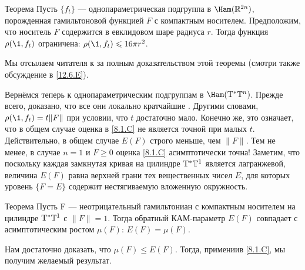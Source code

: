\begin{thm}{Теорема}\label{8.2.A}
Пусть $\{f_t\}$ — однопараметрическая подгруппа в $\Ham (\RR^{2n})$,
порожденная гамильтоновой функцией $F$ с компактным носителем. 
Предположим, что носитель $F$ содержится в евклидовом шаре радиуса
$r$. 
Тогда функция $\rho (\1, f_t)$ ограничена: $\rho (\1, f_t) \z\le 16\pi
r^2$. 
\end{thm}

Мы отсылаем читателя к \cite[с. 177]{HZ} за полным доказательством
этой теоремы (смотри также обсуждение в \ref{12.6.E}). 

Вернёмся теперь к однопараметрическим подгруппам в $\Ham (\T^\ast \TT^n)$.
Прежде всего, доказано, что все они локально кратчайшие \cite{LM2}.
Другими словами, $\rho (\1, f_t) = t \| F \|$ при условии, что $t$
достаточно мало. 
Конечно же, это означает, что в общем случае оценка в \ref{8.1.C} не является
точной при малых $t$. 
Действительно, в общем случае $E (F)$ строго меньше, чем $\| F \|$.
Тем не менее, в случае $n = 1$ и $F \ge 0$ оценка \ref{8.1.C}
асимптотически точна! 
Заметим, что поскольку каждая замкнутая кривая на цилиндре $\mathrm{T}^\ast
\mathbb{T}^1$ является лагранжевой, величина $E (F)$ равна верхней грани тех
вещественных чисел $E$, для которых уровень $\{F = E\}$ содержит
нестягиваемую вложенную окружность. 

\begin{thm}[(\cite{PS})]{Теорема}\label{8.2.B}
  Пусть F — неотрицательный гамильтониан с компактным носителем на
  цилиндре $\mathrm{T}^\ast \mathbb{T}^1$ с $\| F \| = 1$. 
  Тогда обратный КАМ-параметр $E (F)$ совпадает с асимптотическим
  ростом $\mu (F)$: $E (F) = \mu (F)$. 
\end{thm}

Нам достаточно доказать, что $\mu (F) \le E (F)$.
Тогда, примениив \ref{8.1.C}, мы получим желаемый результат.

